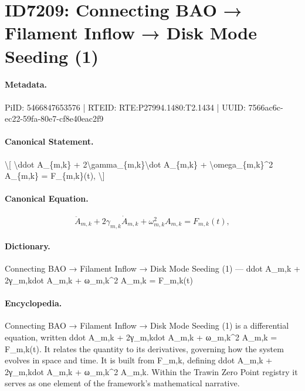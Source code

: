 \section*{ID7209: Connecting BAO → Filament Inflow → Disk Mode Seeding (1)}
\paragraph{Metadata.}
PiID: 5466847653576 | RTEID: RTE:P27994.1480:T2.1434 | UUID: 7566ac6c-ec22-59fa-80e7-cf8e40eac2f9

\paragraph{Canonical Statement.}
\textbackslash{}[ \textbackslash{}ddot A\_\{m,k\} + 2\textbackslash{}gamma\_\{m,k\}\textbackslash{}dot A\_\{m,k\} + \textbackslash{}omega\_\{m,k\}\textasciicircum{}2 A\_\{m,k\} = F\_\{m,k\}(t), \textbackslash{}]

\paragraph{Canonical Equation.}
\[
\ddot A_{m,k} + 2\gamma_{m,k}\dot A_{m,k} + \omega_{m,k}^2 A_{m,k} = F_{m,k}(t),
\]

\paragraph{Dictionary.}
Connecting BAO → Filament Inflow → Disk Mode Seeding (1) — ddot A\_m,k + 2γ\_m,kdot A\_m,k + ω\_m,k\textasciicircum{}2 A\_m,k = F\_m,k(t)

\paragraph{Encyclopedia.}
Connecting BAO → Filament Inflow → Disk Mode Seeding (1) is a differential equation, written ddot A\_m,k + 2γ\_m,kdot A\_m,k + ω\_m,k\textasciicircum{}2 A\_m,k = F\_m,k(t). It relates the quantity to its derivatives, governing how the system evolves in space and time. It is built from F\_m,k, defining ddot A\_m,k + 2γ\_m,kdot A\_m,k + ω\_m,k\textasciicircum{}2 A\_m,k. Within the Trawin Zero Point registry it serves as one element of the framework's mathematical narrative.
